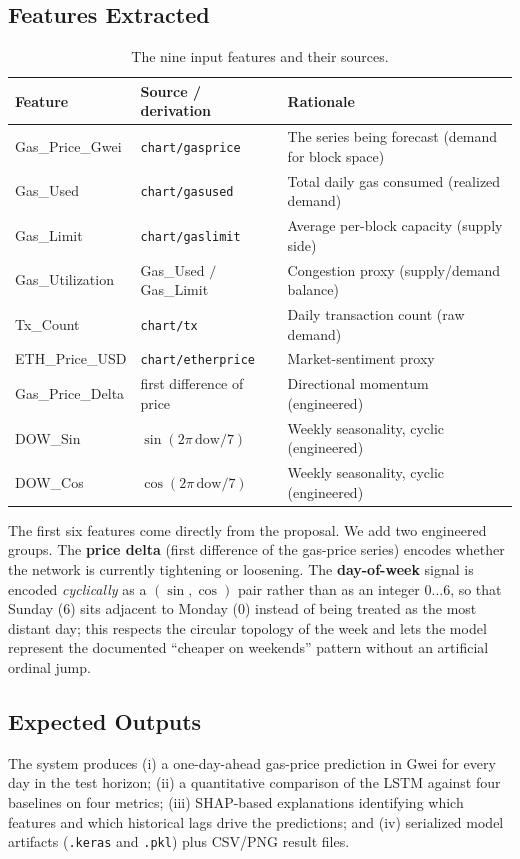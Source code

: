 \documentclass[11pt,a4paper]{article}
\begin{document}
\subsection{Features Extracted}
\begin{table}[h]
\centering
\caption{The nine input features and their sources.}
\label{tab:features}
\small
\begin{tabular}{@{}llp{6.6cm}@{}}
\toprule
\textbf{Feature} & \textbf{Source / derivation} & \textbf{Rationale} \\
\midrule
Gas\_Price\_Gwei  & \texttt{chart/gasprice}   & The series being forecast (demand for block space) \\
Gas\_Used         & \texttt{chart/gasused}    & Total daily gas consumed (realized demand) \\
Gas\_Limit        & \texttt{chart/gaslimit}   & Average per-block capacity (supply side) \\
Gas\_Utilization  & Gas\_Used $/$ Gas\_Limit  & Congestion proxy (supply/demand balance) \\
Tx\_Count         & \texttt{chart/tx}         & Daily transaction count (raw demand) \\
ETH\_Price\_USD   & \texttt{chart/etherprice} & Market-sentiment proxy \\
Gas\_Price\_Delta & first difference of price & Directional momentum (engineered) \\
DOW\_Sin          & $\sin(2\pi\,\text{dow}/7)$ & Weekly seasonality, cyclic (engineered) \\
DOW\_Cos          & $\cos(2\pi\,\text{dow}/7)$ & Weekly seasonality, cyclic (engineered) \\
\bottomrule
\end{tabular}
\end{table}

The first six features come directly from the proposal. We add two engineered groups. The
\textbf{price delta} (first difference of the gas-price series) encodes whether the network is
currently tightening or loosening. The \textbf{day-of-week} signal is encoded \emph{cyclically}
as a $(\sin,\cos)$ pair rather than as an integer $0\ldots6$, so that Sunday (6) sits adjacent to
Monday (0) instead of being treated as the most distant day; this respects the circular topology
of the week and lets the model represent the documented ``cheaper on weekends'' pattern without
an artificial ordinal jump.

\subsection{Expected Outputs}
The system produces (i) a one-day-ahead gas-price prediction in Gwei for every day in the test
horizon; (ii) a quantitative comparison of the LSTM against four baselines on four metrics;
(iii) SHAP-based explanations identifying which features and which historical lags drive the
predictions; and (iv) serialized model artifacts (\texttt{.keras} and \texttt{.pkl}) plus
CSV/PNG result files.
\end{document}
